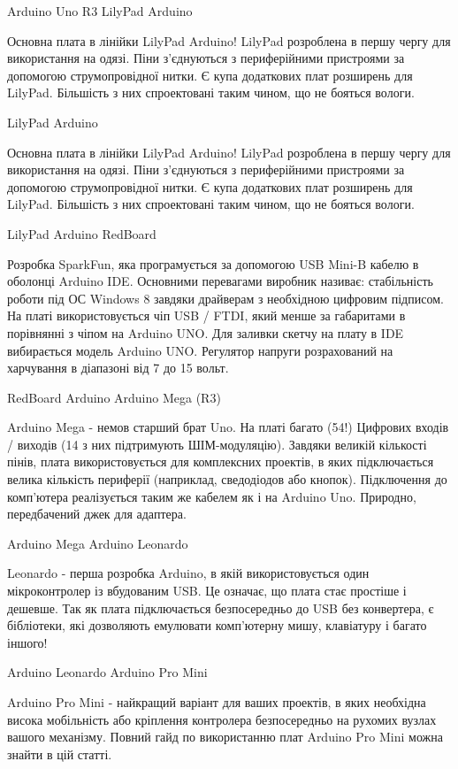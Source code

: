 \documentclass[12pt,a4paper]{report}  %
\begin{document}
Arduino Uno R3
LilyPad Arduino

Основна плата в лінійки LilyPad Arduino! LilyPad розроблена в першу чергу для використання на одязі. Піни з'єднуються з периферійними пристроями за допомогою струмопровідної нитки. Є купа додаткових плат розширень для LilyPad. Більшість з них спроектовані таким чином, що не бояться вологи.

LilyPad Arduino

Основна плата в лінійки LilyPad Arduino! LilyPad розроблена в першу чергу для використання на одязі. Піни з'єднуються з периферійними пристроями за допомогою струмопровідної нитки. Є купа додаткових плат розширень для LilyPad. Більшість з них спроектовані таким чином, що не бояться вологи.

LilyPad Arduino
RedBoard

Розробка SparkFun, яка програмується за допомогою USB Mini-B кабелю в оболонці Arduino IDE. Основними перевагами виробник називає: стабільність роботи під ОС Windows 8 завдяки драйверам з необхідною цифровим підписом. На платі використовується чіп USB / FTDI, який менше за габаритами в порівнянні з чіпом на Arduino UNO. Для заливки скетчу на плату в IDE вибирається модель Arduino UNO. Регулятор напруги розрахований на харчування в діапазоні від 7 до 15 вольт.

RedBoard Arduino
Arduino Mega (R3)

Arduino Mega - немов старший брат Uno. На платі багато (54!) Цифрових входів / виходів (14 з них підтримують ШІМ-модуляцію). Завдяки великій кількості пінів, плата використовується для комплексних проектів, в яких підключається велика кількість периферії (наприклад, сведодіодов або кнопок). Підключення до комп'ютера реалізується таким же кабелем як і на Arduino Uno. Природно, передбачений джек для адаптера.

Arduino Mega
Arduino Leonardo

Leonardo - перша розробка Arduino, в якій використовується один мікроконтролер із вбудованим USB. Це означає, що плата стає простіше і дешевше. Так як плата підключається безпосередньо до USB без конвертера, є бібліотеки, які дозволяють емулювати комп'ютерну мишу, клавіатуру і багато іншого!

Arduino Leonardo
Arduino Pro Mini

Arduino Pro Mini - найкращий варіант для ваших проектів, в яких необхідна висока мобільність або кріплення контролера безпосередньо на рухомих вузлах вашого механізму. Повний гайд по використанню плат Arduino Pro Mini можна знайти в цій статті.
\end{document}
